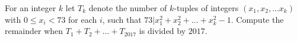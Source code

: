 For an integer $k$ let $T_k$ denote the number of $k$-tuples of integers $(x_1,x_2,...x_k)$ with $0\le x_i < 73$ for each $i$, such that $73|x_1^2+x_2^2+...+x_k^2-1$. Compute the remainder when $T_1+T_2+...+T_{2017}$ is divided by $2017$.
